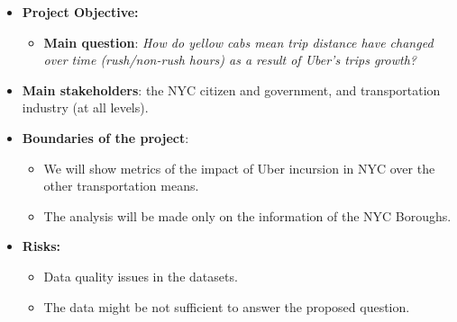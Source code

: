 \documentclass[11pt]{article}
\begin{document}
\begin{itemize}

\item \textbf{Project Objective:}
\begin{itemize}
\item \textbf{Main question}: \textit{How do yellow cabs mean trip distance have changed over time (rush/non-rush hours) as a result of Uber's trips growth?} \\ 
\end{itemize}

\item \textbf{Main stakeholders}: the NYC citizen and government, and transportation industry (at all levels).

\item \textbf{Boundaries of the project}:

\begin{itemize}
\item We will show metrics of the impact of Uber incursion in NYC over the other transportation means.
\item The analysis will be made only on the information of the NYC Boroughs.
\end{itemize}

\item \textbf{Risks:} 
\begin{itemize}
\item Data quality issues in the datasets.
\item The data might be not sufficient to answer the proposed question. 
\end{itemize}

\end{itemize}
\end{document}
